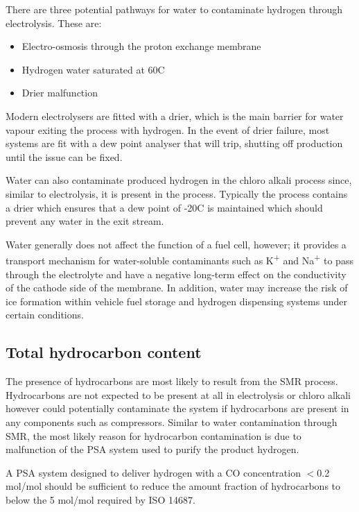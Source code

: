 There are three potential pathways for water to contaminate hydrogen through electrolysis. These are:
\begin{itemize}
    \item Electro-osmosis through the proton exchange membrane
    \item Hydrogen water saturated at 60\textdegree C
    \item Drier malfunction
\end{itemize}
Modern electrolysers are fitted with a drier, which is the main barrier for water vapour exiting the process with hydrogen. \cite{Bacquart2018} In the event of drier failure, most systems are fit with a dew point analyser that will trip, shutting off production until the issue can be fixed. \cite{Bacquart2018}

Water can also contaminate produced hydrogen in the chloro alkali process since, similar to electrolysis, it is present in the process. Typically the process contains a drier which ensures that a dew point of -20\textdegree C is maintained which should prevent any water in the exit stream.  

Water generally does not affect the function of a fuel cell, however; it provides a transport mechanism for water-soluble contaminants such as K\textsuperscript{+} and Na\textsuperscript{+} \cite{InternationalStandardISO14687-2:20122012} to pass through the electrolyte and have a negative long-term effect on the conductivity of the cathode side of the membrane. In addition, water may increase the risk of ice formation within vehicle fuel storage and hydrogen dispensing systems under certain conditions. 

\subsection*{Total hydrocarbon content}
The presence of hydrocarbons are most likely to result from the SMR process. Hydrocarbons are not expected to be present at all in electrolysis or chloro alkali however could potentially contaminate the system if hydrocarbons are present in any components such as compressors. Similar to water contamination through SMR, the most likely reason for hydrocarbon contamination is due to malfunction of the PSA system used to purify the product hydrogen. 

A PSA system designed to deliver hydrogen with a CO concentration $<$0.2 \textmu mol/mol should be sufficient to reduce the amount fraction of hydrocarbons to below the 5 \textmu mol/mol required by ISO 14687. \cite{Bacquart2018}

